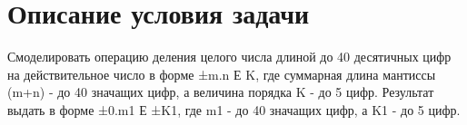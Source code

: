 \section{Описание условия задачи}
Смоделировать операцию деления целого числа длиной до
40 десятичных цифр на действительное число в форме
±m.n Е K, где суммарная длина мантиссы (m+n) - до 40
значащих цифр, а величина порядка K - до 5 цифр.
Результат выдать в форме ±0.m1 Е ±K1, где m1 - до 40
значащих цифр, а K1 - до 5 цифр.

